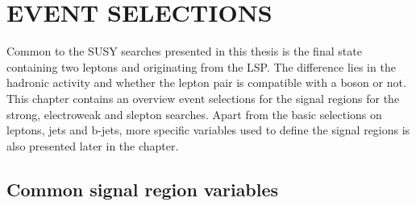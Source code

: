 \chapter{EVENT SELECTIONS}\label{sec:eventSelection}
Common to the SUSY searches presented in this thesis is the final state containing two leptons and \ptmiss originating from the LSP.
The difference lies in the hadronic activity and whether the lepton pair is compatible with a \PZ boson or not. 
This chapter contains an overview event selections for the signal regions for the strong, electroweak and slepton searches. 
Apart from the basic selections on leptons, jets and b-jets, more specific variables used to define the signal regions is also presented later in the chapter. 
\section{Common signal region variables}
